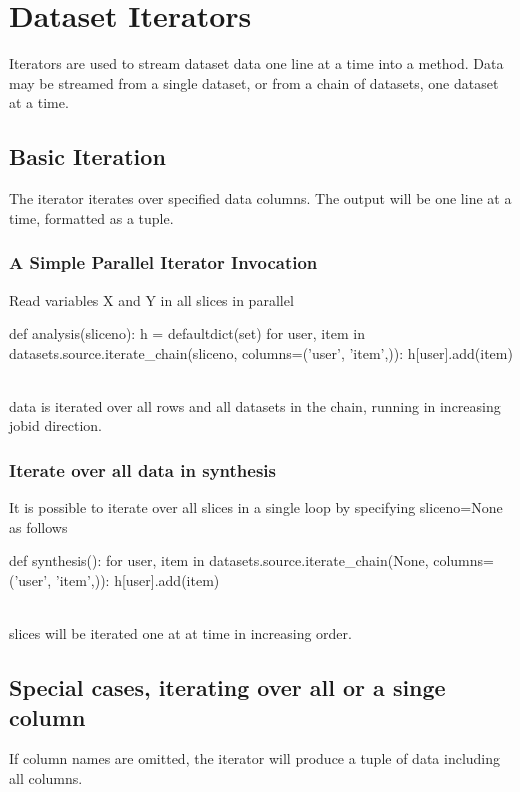 \section{Dataset Iterators}

Iterators are used to stream dataset data one line at a time into a
method.  Data may be streamed from a single dataset, or from a chain
of datasets, one dataset at a time.


\subsection{Basic Iteration}

The iterator iterates over specified data columns.  The output will be
one line at a time, formatted as a tuple.

\subsubsection*{A Simple Parallel Iterator Invocation}
Read variables X and Y in all slices in parallel

\begin{python}
def analysis(sliceno):
    h = defaultdict(set)
    for user, item in datasets.source.iterate_chain(sliceno, columns=('user', 'item',)):
        h[user].add(item)
\end{python}
\\
data is iterated over all rows and all datasets in the chain, running
in increasing jobid direction.


\subsubsection*{Iterate over all data in synthesis}
It is possible to iterate over all slices in a single loop by
specifying sliceno=None as follows

\begin{python}
def synthesis():
    for user, item in datasets.source.iterate_chain(None, columns=('user', 'item',)):
        h[user].add(item)
\end{python}
\\
slices will be iterated one at at time in increasing order.


\subsection{Special cases, iterating over all or a singe column}
If column names are omitted, the iterator will produce a tuple of data
including all columns.  %

